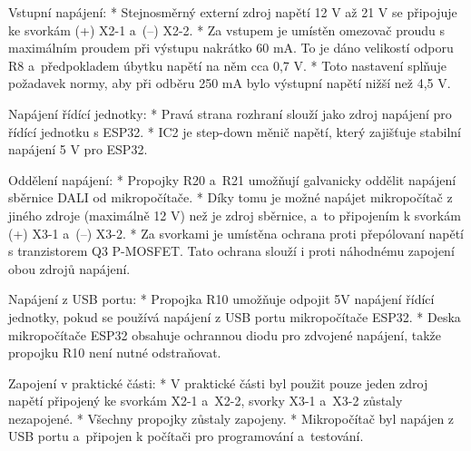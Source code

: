 \medskip
\noindent
{\sbf Vstupní napájení:}
\begitems
    * Stejnosměrný externí zdroj napětí 12 V až 21 V se připojuje ke svorkám (+) X2-1 a~(--) X2-2.
    * Za vstupem je umístěn omezovač proudu s maximálním proudem při výstupu nakrátko 60 mA.
    To je dáno velikostí odporu R8 a~předpokladem úbytku napětí na něm cca 0,7 V.
    * Toto nastavení splňuje požadavek normy, aby při odběru 250 mA bylo výstupní napětí nižší než 4,5 V.
\enditems

\noindent
{\sbf Napájení řídící jednotky:}
\begitems
    * Pravá strana rozhraní slouží jako zdroj napájení pro řídící jednotku s ESP32.
    * IC2 je step-down měnič napětí, který zajišťuje stabilní napájení 5 V pro ESP32.
\enditems

\noindent
{\sbf Oddělení napájení:}
\begitems
    * Propojky R20 a~R21 umožňují galvanicky oddělit napájení sběrnice DALI od mikropočítače.
    * Díky tomu je možné napájet mikropočítač z jiného zdroje (maximálně 12 V) než je zdroj sběrnice,
     a~to připojením k svorkám (+) X3-1 a~(--) X3-2.
    * Za svorkami je umístěna ochrana proti přepólovaní napětí s tranzistorem Q3 P-MOSFET.
    Tato ochrana slouží i proti náhodnému zapojení obou zdrojů napájení.
\enditems

\noindent
{\sbf Napájení z USB portu:}
\begitems
    * Propojka R10 umožňuje odpojit 5V napájení řídící jednotky, pokud se používá napájení z USB portu mikropočítače ESP32.
    * Deska mikropočítače ESP32 obsahuje ochrannou diodu pro zdvojené napájení, takže propojku R10 není nutné odstraňovat.
\enditems

\noindent
{\sbf Zapojení v praktické části:}
\begitems
    * V praktické části byl použit pouze jeden zdroj napětí připojený ke svorkám X2-1 a~X2-2,
      svorky {X3-1} a~{X3-2} zůstaly nezapojené.
    * Všechny propojky zůstaly zapojeny.
    * Mikropočítač byl napájen z USB portu a~připojen k počítači pro programování a~testování.
\enditems








